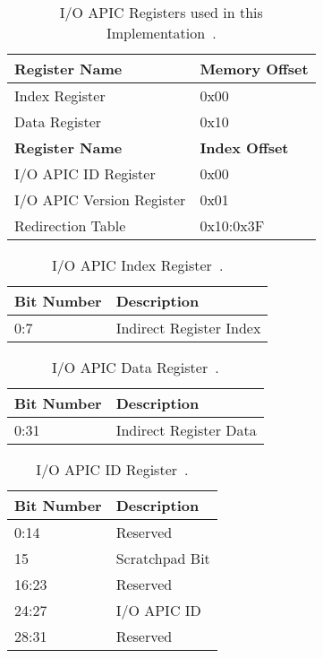 \begin{table}[H]
  \centering
  \begin{tabularx}{1.0\textwidth}{| X | X |}
    \hline
    \textbf{Register Name}    & \textbf{Memory Offset} \\ \hline\hline
    Index Register            & 0x00                   \\ \hline
    Data Register             & 0x10                   \\ \hline\hline
    \textbf{Register Name}    & \textbf{Index Offset}  \\ \hline\hline
    I/O APIC ID Register      & 0x00                   \\ \hline
    I/O APIC Version Register & 0x01                   \\ \hline
    Redirection Table         & 0x10:0x3F              \\ \hline
  \end{tabularx}
  \caption{I/O APIC Registers used in this Implementation~\cite[sec.~9.5]{ich5}.}
  \label{tab:ioapicregs}
\end{table}

\begin{table}[H]
  \centering
  \begin{tabularx}{1.0\textwidth}{| X | X |}
    \hline
    \textbf{Bit Number} & \textbf{Description}    \\ \hline\hline
    0:7                 & Indirect Register Index \\ \hline
  \end{tabularx}
  \caption{I/O APIC Index Register~\cite[sec.~9.5.2]{ich5}.}
  \label{tab:ioapicregsidx}
\end{table}

\begin{table}[H]
  \centering
  \begin{tabularx}{1.0\textwidth}{| X | X |}
    \hline
    \textbf{Bit Number} & \textbf{Description}   \\ \hline\hline
    0:31                & Indirect Register Data \\ \hline
  \end{tabularx}
  \caption{I/O APIC Data Register~\cite[sec.~9.5.3]{ich5}.}
  \label{tab:ioapicregsdat}
\end{table}

\begin{table}[H]
  \centering
  \begin{tabularx}{1.0\textwidth}{| X | X |}
    \hline
    \textbf{Bit Number} & \textbf{Description} \\ \hline\hline
    0:14                & Reserved             \\ \hline
    15                  & Scratchpad Bit       \\ \hline
    16:23               & Reserved             \\ \hline
    24:27               & I/O APIC ID          \\ \hline
    28:31               & Reserved             \\ \hline
  \end{tabularx}
  \caption{I/O APIC ID Register~\cite[sec.~9.5.6]{ich5}.}
  \label{tab:ioapicregsid}
\end{table}

